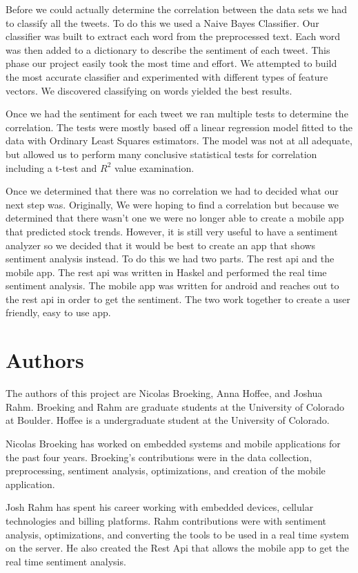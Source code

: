 \documentclass{acm_proc_article-sp}
\begin{document}
Before we could actually determine the correlation between the data sets we had
to classify all the tweets.  To do this we used a Naive Bayes Classifier. Our
classifier was built to extract each word from the preprocessed text. Each word
was then added to a dictionary to describe the sentiment of each tweet.
This phase our project easily took the most time and effort. We attempted to
build the most accurate classifier and experimented with different types of
feature vectors. We discovered classifying on words yielded the best results.

Once we had the sentiment for each tweet we ran multiple tests to determine the
correlation.  The tests were mostly based off a linear regression model fitted
to the data with Ordinary Least Squares estimators. The model was not at all
adequate, but allowed us to perform many conclusive statistical tests for
correlation including a t-test and $R^2$ value examination. 

Once we determined that there was no correlation we had to decided what our
next step was. Originally, We were hoping to find a correlation but because we determined
that there wasn't one we were no longer able to create a mobile app
that predicted stock trends. However, it is still very useful to have a
sentiment analyzer so we decided that it would be best to create an app that
shows sentiment analysis instead. To do this we had two parts.  The rest api
and the mobile app. The rest api was written in Haskel and performed the real
time sentiment analysis.  The mobile app was written for android and reaches out
to the rest api in order to get the sentiment. The two work together to create a user
friendly, easy to use app.


\section{Authors}

The authors of this project are Nicolas Broeking, Anna
Hoffee, and Joshua Rahm. Broeking and Rahm are graduate students at the
University of Colorado at Boulder. Hoffee is a undergraduate student at the
University of Colorado.

Nicolas Broeking has worked on embedded systems and mobile applications for
the past four years. Broeking's contributions were in the data collection,
preprocessing, sentiment analysis, optimizations, and creation of the mobile
application. 

Josh Rahm has spent his career working with embedded devices, cellular
technologies and billing platforms. Rahm contributions were with sentiment
analysis, optimizations, and converting the tools to be used in a real time
system on the server. He also created  the Rest Api that allows the mobile app to get
the real time sentiment analysis.
\end{document}
